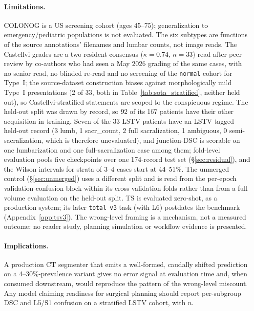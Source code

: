 \documentclass{article}
\newcommand{\sota}{TS}
\begin{document}
\paragraph{Limitations.}
\label{sec:limits-test-set}
COLONOG is a US screening cohort (ages 45--75);
generalization to emergency/pediatric populations is not
evaluated. The six subtypes are functions of the source
annotations' filenames and lumbar counts, not image
reads. The Castellvi grades are a two-resident consensus
($\kappa{=}0.74$, $n{=}33$) read after peer review by
co-authors who had seen a May 2026 grading of the same
cases, with no senior read, no blinded re-read and no
screening of the \texttt{normal} cohort for Type~I; the
source-dataset construction biases against
morphologically mild Type~I presentations (2 of 33, both
in Table~\ref{tab:sota_stratified}, neither held out), so
Castellvi-stratified statements are scoped to the
conspicuous regime. The held-out split was drawn by
record, so 92 of its 167 patients have their other
acquisition in training. Seven of the 33 LSTV patients have an
LSTV-tagged held-out record (3 lumb, 1 sacr\_count, 2 full
sacralization, 1 ambiguous, 0 semi-sacralization, which is
therefore unevaluated), and junction-DSC is scorable on
one lumbarization and one full-sacralization case among
them; fold-level evaluation pools five checkpoints over
one 174-record test set (\S\ref{sec:residual}), and the
Wilson intervals for strata of 3--4 cases start at
44--51\%. The unmerged control (\S\ref{sec:unmerged})
uses a different split and is read from the per-epoch
validation confusion block within its cross-validation
folds rather than from a full-volume evaluation on the
held-out split. \sota{} is evaluated
zero-shot, as a production system; its later
\texttt{total\_v3} task (with L6) postdates the benchmark
(Appendix~\ref{app:tsv3}). The
wrong-level framing is a mechanism, not a measured
outcome: no reader study, planning simulation or workflow
evidence is presented.

\paragraph{Implications.}
A production CT segmenter that emits a well-formed,
caudally shifted prediction on a 4--30\%-prevalence
variant gives no error signal at evaluation time and,
when consumed downstream, would reproduce the pattern of
the wrong-level miscount. Any model claiming readiness for
surgical planning should report per-subgroup DSC and
L5/S1 confusion on a stratified LSTV cohort, with $n$.
\end{document}
